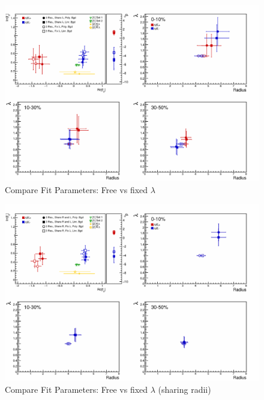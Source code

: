 \documentclass[../AnalysisNoteJBuxton.tex]{subfiles}
\begin{document}
\begin{figure}[h]
  \centering
  \includegraphics[width=\textwidth]{7_ResultsAndDiscussion/Figures/CompareAllScattParams_FreevsFixlam_SepR_NoStav.pdf}
  \caption[Compare Fit Parameters: Free vs fixed $\lambda$]{Compare Fit Parameters: Free vs fixed $\lambda$}
  \label{fig:CompareAllScattParams_FreevsFixlam_SepR_NoStav}
\end{figure}

\begin{figure}[h]
  \centering
  \includegraphics[width=\textwidth]{7_ResultsAndDiscussion/Figures/CompareAllScattParams_FreevsFixlam_ShareR_NoStav.pdf}
  \caption[Compare Fit Parameters: Free vs fixed $\lambda$ (sharing radii)]{Compare Fit Parameters: Free vs fixed $\lambda$ (sharing radii)}
  \label{fig:CompareAllScattParams_FreevsFixlam_ShareR_NoStav}
\end{figure}
\end{document}

